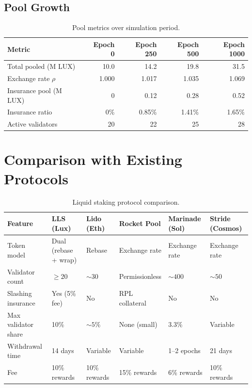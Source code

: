 \documentclass[11pt,a4paper]{article}
\begin{document}
\subsection{Pool Growth}

\begin{table}[H]
\centering
\caption{Pool metrics over simulation period.}
\label{tab:pool_metrics}
\begin{tabular}{lrrrr}
\toprule
\textbf{Metric} & \textbf{Epoch 0} & \textbf{Epoch 250} & \textbf{Epoch 500} & \textbf{Epoch 1000} \\
\midrule
Total pooled (M LUX) & 10.0 & 14.2 & 19.8 & 31.5 \\
Exchange rate $\rho$ & 1.000 & 1.017 & 1.035 & 1.069 \\
Insurance pool (M LUX) & 0 & 0.12 & 0.28 & 0.52 \\
Insurance ratio & 0\% & 0.85\% & 1.41\% & 1.65\% \\
Active validators & 20 & 22 & 25 & 28 \\
\bottomrule
\end{tabular}
\end{table}

\section{Comparison with Existing Protocols}\label{sec:comparison}

\begin{table}[H]
\centering
\caption{Liquid staking protocol comparison.}
\label{tab:comparison}
\begin{tabular}{p{2.5cm}p{2cm}p{2cm}p{2cm}p{2cm}p{2cm}}
\toprule
\textbf{Feature} & \textbf{LLS (Lux)} & \textbf{Lido (Eth)} & \textbf{Rocket Pool} & \textbf{Marinade (Sol)} & \textbf{Stride (Cosmos)} \\
\midrule
Token model & Dual (rebase + wrap) & Rebase & Exchange rate & Exchange rate & Exchange rate \\
Validator count & $\geq 20$ & $\sim 30$ & Permissionless & $\sim 400$ & $\sim 50$ \\
Slashing insurance & Yes (5\% fee) & No & RPL collateral & No & No \\
Max validator share & 10\% & $\sim 5\%$ & None (small) & 3.3\% & Variable \\
Withdrawal time & 14 days & Variable & Variable & 1--2 epochs & 21 days \\
Fee & 10\% rewards & 10\% rewards & 15\% rewards & 6\% rewards & 10\% rewards \\
\bottomrule
\end{tabular}
\end{table}
\end{document}
